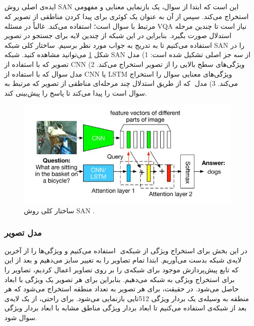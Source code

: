 {	\subsection{}
	{
		ایده‌ی اصلی روش SAN‌ این است که ابتدا از سوال، یک  بازنمایی معنایی و مفهومی استخراج می‌کند. سپس از آن به عنوان یک کوئری برای پیدا کردن مناطقی از تصویر که مرتبط با سوال است؛ استفاده می‌کند. غالباً در مسئله VQA نیاز است تا چندین مرحله استدلال صورت بگیرد. بنابراین در این شبکه از چندین لایه برای جستجو در تصویر استفاده می‌کنیم تا به تدریج به جواب مورد نظر برسیم. ساختار کلی شبکه SAN را در شکل 
		\ref{fig:1}
		می‌توانید مشاهده کنید. شبکه SAN از سه جز اصلی تشکیل شده است: 1) مدل تصویر که با استفاده از CNN ویژگی‌های سطح بالایی را از تصویر استخراج می‌کند. 2) مدل سوال که با استفاده از CNN یا LSTM ویژگی‌های معنایی سوال را استخراج می‌کند. 3) مدل
		 ‌ که از طریق استدلال چند مرحله‌ای مناطقی از تصویر که مرتبط به سوال است را پیدا می‌کند تا پاسخ را پیش‌بینی کند.
		\begin{figure}
			\centering
			\includegraphics[scale=0.5]{images/san.jpg}
			\caption{ساختار کلی روش SAN .}
			\label{fig:1}
		\end{figure}
	
		\subsubsection{مدل تصویر}
		{
			در این بخش برای استخراج ویژگی از شبکه‌ی
			 ‌ استفاده می‌کنیم و ویژگی‌ها را از آخرین لایه‌ی
			  ‌شبکه بدست می‌آوریم. ابتدا تمام تصاویر را به
			  تغییر سایز می‌دهیم و بعد از این که تابع پیش‌پردازش موجود برای شبکه‌ی 
			   را بر روی تصاویر اعمال کردیم، تصاویر را برای استخراج ویژگی به شبکه می‌دهیم. بنابراین برای هر تصویر یک ویژگی با ابعاد
			 حاصل می‌شود. در حقیقت، برای هر تصویر به تعداد
			 منطقه استخراج می‌شود که هر منطقه به وسیله‌ی یک بردار ویژگی 512تایی بازنمایی می‌شود. برای راحتی، از یک لایه‌ی
			 بعد از شبکه‌ی 
			استفاده می‌کنیم تا ابعاد بردار ویژگی مناطق مشابه با ابعاد بردار ویژگی سوال شود.
		}
	
}}
